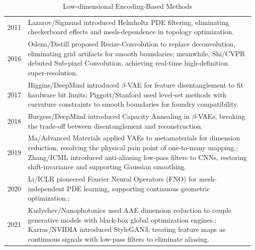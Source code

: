 \begin{table}[H] 
\centering
\begin{tabularx}{\textwidth}{l | >{\linespread{1.0}\selectfont\arraybackslash}X}
\hline \rule{0pt}{1.8em}2011 & Lazarov/Sigmund introduced Helmholtz PDE filtering, eliminating checkerboard effects and mesh-dependence in topology optimization.\cite{lazarov2011_filters} \\[1.5em]

2016 & Odena/Distill proposed Resize-Convolution to replace deconvolution, eliminating grid artifacts for smooth boundaries; meanwhile\cite{odena2016_deconvolution}, Shi/CVPR debuted Sub-pixel Convolution, achieving real-time high-definition super-resolution.\cite{shi2016_subpixel_cnn} \\[1.5em]

2017 & Higgins/DeepMind introduced $\beta$-VAE for feature disentanglement to fit hardware bit limits\cite{higgins2017_betavae}; Piggott/Stanford used level-set methods with curvature constraints to smooth boundaries for foundry compatibility.\cite{piggott2017_fabrication} \\[1.5em]

2018 & Burgess/DeepMind introduced Capacity Annealing in $\beta$-VAEs, breaking the trade-off between disentanglement and reconstruction.\cite{burgess2018_understanding_betavae} \\[1.5em]

2019 & Ma/Advanced Materials applied VAEs to metamaterials for dimension reduction, resolving the physical pain point of one-to-many mapping.\cite{ma2019_probabilistic}; Zhang/ICML introduced anti-aliasing low-pass filters to CNNs, restoring shift-invariance and supporting Gaussian smoothing.\cite{zhang2019_shift_invariant} \\[1.5em]

2020 & Li/ICLR pioneered Fourier Neural Operators (FNO) for mesh-independent PDE learning, supporting continuous geometric optimization.\cite{li2020_fourier_neural_operator}; \\[1.5em]

2021 & Kudyshev/Nanophotonics used AAE dimension reduction to couple generative models with black-box global optimization engines.\cite{kudyshev2021_machine_learning}; Karras/NVIDIA introduced StyleGAN3, treating feature maps as continuous signals with low-pass filters to eliminate aliasing.\cite{karras2021_alias_free} \\[1.5em]

\hline
\end{tabularx}
\caption{Low-dimensional Encoding-Based Methods}
\label{tab:encoding_methods}
\end{table}
\clearpage